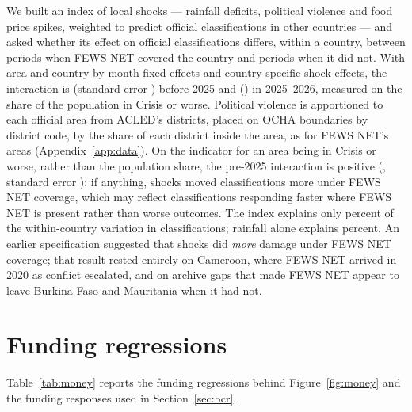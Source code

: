 \documentclass[11pt]{article}
\begin{document}
\begin{appendices}
We built an index of local shocks --- rainfall deficits, political violence and food price spikes, weighted to predict official classifications in other countries --- and asked whether its effect on official classifications differs, within a country, between periods when FEWS NET covered the country and periods when it did not. With area and country-by-month fixed effects and country-specific shock effects, the interaction is \covPre{} (standard error \covPreSe{}) before 2025 and \covPost{} (\covPostSe{}) in 2025--2026, measured on the share of the population in Crisis or worse. Political violence is apportioned to each official area from ACLED's districts, placed on OCHA boundaries by district code, by the share of each district inside the area, as for FEWS NET's areas (Appendix~\ref{app:data}). On the indicator for an area being in Crisis or worse, rather than the population share, the pre-2025 interaction is positive (\covPrePhase{}, standard error \covPrePhaseSe{}): if anything, shocks moved classifications more under FEWS NET coverage, which may reflect classifications responding faster where FEWS NET is present rather than worse outcomes. The index explains only \shockRsq{} percent of the within-country variation in classifications; rainfall alone explains \shockRsqRain{} percent. An earlier specification suggested that shocks did \emph{more} damage under FEWS NET coverage; that result rested entirely on Cameroon, where FEWS NET arrived in 2020 as conflict escalated, and on archive gaps that made FEWS NET appear to leave Burkina Faso and Mauritania when it had not.

\section{Funding regressions}\label{app:money}

Table~\ref{tab:money} reports the funding regressions behind Figure~\ref{fig:money} and the funding responses used in Section~\ref{sec:bcr}.

\begin{table}[htbp]
\centering


\end{table}
\end{appendices}
\end{document}
